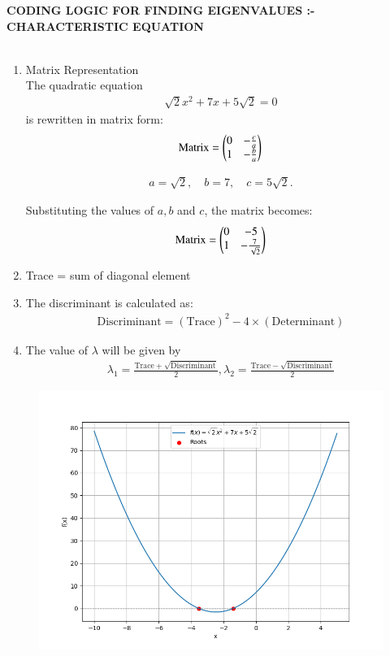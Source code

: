 \documentclass[journal]{IEEEtran}
\numberwithin{equation}{enumi}
\numberwithin{figure}{enumi}
\begin{document}
\begin{enumerate}
\textbf{CODING LOGIC FOR FINDING EIGENVALUES :- CHARACTERISTIC EQUATION}\\
\


\begin{enumerate}
\item Matrix Representation \\
The quadratic equation 
\begin{align}
\sqrt{2}x^2 + 7x + 5\sqrt{2} = 0
\end{align}
is rewritten in matrix form:
\begin{align}
\text{Matrix} =
\begin{pmatrix}0 & -\frac{c}{a} \\
1 & -\frac{b}{a}
\end{pmatrix}
\end{align}

\begin{align}
a = \sqrt{2}, \quad b = 7, \quad c = 5\sqrt{2}.
\end{align}

Substituting the values of $a,b$ and $c$, the matrix becomes:
\begin{align}
\text{Matrix} =
\begin{pmatrix}0 & -5 \\
1 & -\frac{7}{\sqrt{2}}
\end{pmatrix}
\end{align}
\item Trace = sum of diagonal element

\item The discriminant is calculated as:
  \begin{align}
  \text{Discriminant} = (\text{Trace})^2 - 4 \times (\text{Determinant})
  \end{align}


\item The value of $\lambda$ will be given by\\
\begin{align}
  \lambda_1 = \frac{\text{Trace} + \sqrt{\text{Discriminant}}}{2}, 
  \lambda_2 = \frac{\text{Trace} - \sqrt{\text{Discriminant}}}{2}
  \end{align}


\end{enumerate}




\begin{figure}[h!]
   \centering
   \includegraphics[width=0.7\linewidth]{figs/Figure_2.png}
\end{figure}
\end{enumerate}
\end{document}
